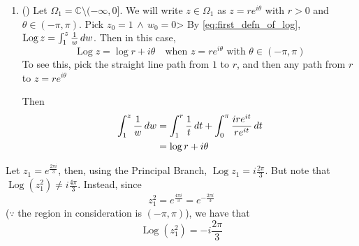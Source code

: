 \documentclass[11pt, oneside]{book}
\DeclareMathOperator{\Log}{Log}
\begin{document}
\begin{enumerate}
  \item () Let $\Omega_1 = \mathbb{C} \setminus (- \infty, 0]$. We will write $z \in \Omega_1$ as $z = re^{i \theta}$ with $r > 0$ and $\theta \in (- \pi, \pi)$. Pick $z_0 = 1 \, \land \, w_0 = 0$> By \cref{eq:first_defn_of_log}, $\Log z = \int_{1}^{z} \frac{1}{w} \dif{w}$. Then in this case,
  \begin{equation*}
    \Log z = \log r + i \theta \quad \text{when } z = re^{i \theta} \text{ with } \theta \in (- \pi, \pi)
  \end{equation*}
  To see this, pick the straight line path from $1$ to $r$, and then any path from $r$ to $z = re^{i \theta}$
  \begin{center}
  \end{center}
  Then
  \begin{align*}
    \int_{1}^{z} \frac{1}{w} \mathop{}\!d{w}
      &= \int_{1}^{r} \frac{1}{t} \mathop{}\!d{t} + \int_{0}^{\pi} \frac{ire^{i t}}{re^{i t}} \mathop{}\!d{t} \\
      &= \log r + i \theta
  \end{align*}
\end{enumerate}

\begin{ex}
  Let $z_1 = e^{\frac{2 \pi i}{3}}$, then, using the Principal Branch, $\Log z_1 = i \frac{2 \pi}{3}$. But note that $\Log (z_1^2) \neq i \frac{4 \pi}{3}$. Instead, since
  \begin{equation*}
    z_1^2 = e^{\frac{4 \pi i}{3}} = e^{- \frac{2 \pi i}{3}}
  \end{equation*}
  ($\because$ the region in consideration is $(- \pi, \pi)$), we have that
  \begin{equation*}
    \Log (z_1^2) = -i \frac{2 \pi}{3}
  \end{equation*}
\end{ex}
\end{document}
